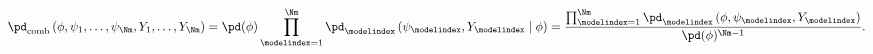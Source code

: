 \begin{equation}
  \pd_{\text{comb}}\left(\phi, \psi_{1}, \ldots, \psi_{\Nm}, Y_{1}, \ldots, Y_{\Nm}\right) =
  \pd(\phi) \prod_{\modelindex = 1}^{\Nm} \pd_{\modelindex}\left(\psi_{\modelindex}, Y_{\modelindex} \mid \phi\right) =
  \frac{\prod_{\modelindex = 1}^{\Nm} \pd_{\modelindex}\left(\phi, \psi_{\modelindex}, Y_{\modelindex}\right)}{\pd(\phi)^{\Nm - 1}}.
  \label{eqn:markov-combination}
\end{equation}